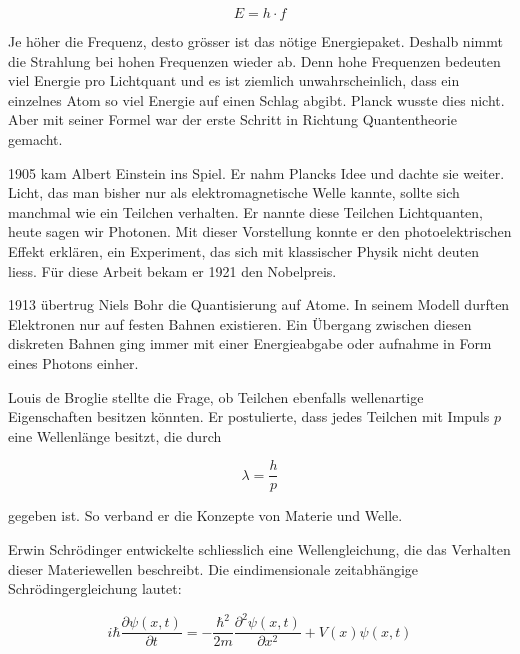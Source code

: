	
	\begin{equation}
		E = h \cdot f
	\end{equation}
	 
	 
	Je höher die Frequenz, desto grösser ist das nötige Energiepaket. 
	Deshalb nimmt die Strahlung bei hohen Frequenzen wieder ab. Denn hohe Frequenzen bedeuten viel Energie pro Lichtquant und es ist ziemlich unwahrscheinlich, dass ein einzelnes Atom so viel Energie auf einen Schlag abgibt. 
	Planck wusste dies nicht. 
	Aber mit seiner Formel war der erste Schritt in Richtung Quantentheorie gemacht.
	
	
	
	1905 kam Albert Einstein ins Spiel. 
	Er nahm Plancks Idee und dachte sie weiter. 
	Licht, das man bisher nur als elektromagnetische Welle kannte, sollte sich manchmal wie ein Teilchen verhalten.
	Er nannte diese Teilchen Lichtquanten, heute sagen wir Photonen. 
	Mit dieser Vorstellung konnte er den photoelektrischen Effekt erklären, ein Experiment, das sich mit klassischer Physik nicht deuten liess. 
	Für diese Arbeit bekam er 1921 den Nobelpreis.
	 
	
	1913 übertrug Niels Bohr die Quantisierung auf Atome. 
	In seinem Modell durften Elektronen nur auf festen Bahnen existieren. 
	Ein Übergang zwischen diesen diskreten Bahnen ging immer mit einer Energieabgabe oder aufnahme in Form eines Photons einher. 

	
	Louis de Broglie stellte die Frage, ob Teilchen ebenfalls wellenartige Eigenschaften besitzen könnten. 
	Er postulierte, dass jedes Teilchen mit Impuls $p$ eine Wellenlänge besitzt, die durch
	
	
	\begin{equation}
		\lambda = \frac{h}{p}
	\end{equation}
	
	
	gegeben ist. So verband er die Konzepte von Materie und Welle.
	
	
	Erwin Schrödinger entwickelte schliesslich eine Wellengleichung, die das Verhalten dieser Materiewellen beschreibt. Die eindimensionale zeitabhängige Schrödingergleichung lautet:
	
	
	\begin{equation}
		i \hbar \frac{\partial \psi(x,t)}{\partial t} = -\frac{\hbar^2}{2m} \frac{\partial^2 \psi(x,t)}{\partial x^2} + V(x) \psi(x,t)
	\end{equation}
	
